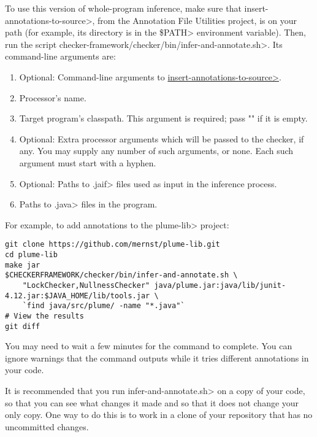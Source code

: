\begin{sloppypar}
To use this version of whole-program inference, make sure that
\<insert-annotations-to-source>, from the Annotation File Utilities project,
is on your path (for example, its directory is in the \<\$PATH> environment variable).
Then, run the script \<checker-framework/checker/bin/infer-and-annotate.sh>.
Its command-line arguments are:
\end{sloppypar}

\begin{enumerate}
\item Optional: Command-line arguments to
  \href{https://eisop.github.io/afu/annotation-file-utilities.html/#insert-annotations-to-source}{\<insert-annotations-to-source>}.
\item Processor's name.
\item Target program's classpath.  This argument is required; pass "" if it
  is empty.
\item Optional: Extra processor arguments which will be passed to the checker, if any.
  You may supply any number of such arguments, or none.  Each such argument
  must start with a hyphen.
\item Optional: Paths to \<.jaif> files used as input in the inference
    process.
\item Paths to \<.java> files in the program.
\end{enumerate}

For example, to add annotations to the \<plume-lib> project:
\begin{Verbatim}
git clone https://github.com/mernst/plume-lib.git
cd plume-lib
make jar
$CHECKERFRAMEWORK/checker/bin/infer-and-annotate.sh \
    "LockChecker,NullnessChecker" java/plume.jar:java/lib/junit-4.12.jar:$JAVA_HOME/lib/tools.jar \
    `find java/src/plume/ -name "*.java"`
# View the results
git diff
\end{Verbatim}

You may need to wait a few minutes for the command to complete.
You can ignore warnings that the command outputs while it tries different
annotations in your code.

It is recommended that you run \<infer-and-annotate.sh> on a copy of your
code, so that you can see what changes it made and so that it does not
change your only copy.  One way to do this is to work in a clone of your
repository that has no uncommitted changes.


